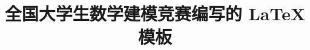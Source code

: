 \usepackage[framemethod=TikZ]{mdframed}
\usepackage{url}   %
\usepackage{subcaption} %
\title{全国大学生数学建模竞赛编写的 \LaTeX{} 模板}

